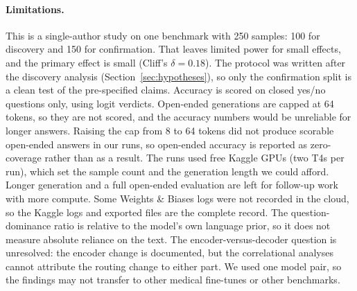 \paragraph{Limitations.}
This is a single-author study on one benchmark with 250 samples: 100 for discovery and
150 for confirmation. That leaves limited power for small effects, and the primary effect
is small (Cliff's $\delta{=}0.18$). The protocol was written after the discovery analysis
(Section~\ref{sec:hypotheses}), so only the confirmation split is a clean test of the
pre-specified claims. Accuracy is scored on closed yes/no questions only, using logit
verdicts. Open-ended generations are capped at 64 tokens, so they are not scored, and the
accuracy numbers would be unreliable for longer answers. Raising the cap from 8 to 64 tokens
did not produce scorable open-ended answers in our runs, so open-ended accuracy is reported
as zero-coverage rather than as a result. The runs used free Kaggle GPUs (two T4s per run),
which set the sample count and the generation length we could afford. Longer generation and
a full open-ended evaluation are left for follow-up work with more compute. Some Weights \&
Biases logs were not recorded in the cloud, so the Kaggle logs and exported files are the
complete record. The question-dominance ratio is
relative to the model's own language prior, so it does not measure absolute reliance on
the text. The encoder-versus-decoder question is unresolved: the encoder change is
documented, but the correlational analyses cannot attribute the routing change to either
part. We used one model pair, so the findings may not transfer to other medical
fine-tunes or other benchmarks.
